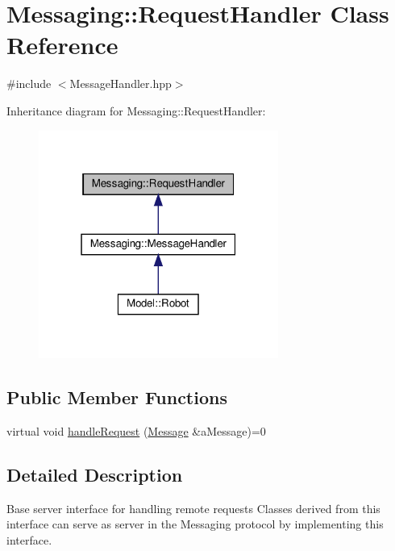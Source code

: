 \hypertarget{class_messaging_1_1_request_handler}{}\section{Messaging\+:\+:Request\+Handler Class Reference}
\label{class_messaging_1_1_request_handler}


{\ttfamily \#include $<$Message\+Handler.\+hpp$>$}



Inheritance diagram for Messaging\+:\+:Request\+Handler\+:
\nopagebreak
\begin{figure}[H]
\begin{center}
\leavevmode
\includegraphics[width=223pt]{class_messaging_1_1_request_handler__inherit__graph}
\end{center}
\end{figure}
\subsection*{Public Member Functions}
\begin{DoxyCompactItemize}
\item 
virtual void \hyperlink{class_messaging_1_1_request_handler_afa23f0ab94ae851a487173a5087da898}{handle\+Request} (\hyperlink{struct_messaging_1_1_message}{Message} \&a\+Message)=0
\end{DoxyCompactItemize}


\subsection{Detailed Description}
Base server interface for handling remote requests Classes derived from this interface can serve as server in the Messaging protocol by implementing this interface. 

